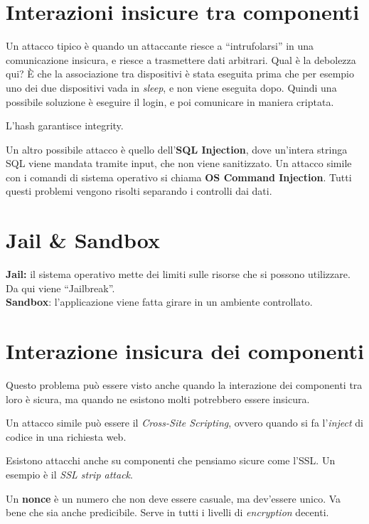 \section{Interazioni insicure tra componenti}

Un attacco tipico è quando un attaccante riesce a ``intrufolarsi'' in una 
comunicazione insicura, e riesce a trasmettere dati arbitrari.
Qual è la debolezza qui? È che la associazione tra dispositivi è stata eseguita 
prima che per esempio uno dei due dispositivi vada in \textit{sleep}, e non 
viene eseguita dopo. Quindi una possibile soluzione è eseguire il login, e poi 
comunicare in maniera criptata.

L'hash garantisce integrity.

Un altro possibile attacco è quello dell'\textbf{SQL Injection}, dove un'intera 
stringa SQL viene mandata tramite input, che non viene sanitizzato. Un attacco 
simile con i comandi di sistema operativo si chiama \textbf{OS Command 
Injection}. Tutti questi problemi vengono risolti separando i controlli dai 
dati.

\section{Jail \& Sandbox}

\textbf{Jail:} il sistema operativo mette dei limiti sulle risorse che si
possono utilizzare.
Da qui viene ``Jailbreak''.\\
\newline
\textbf{Sandbox}: l'applicazione viene fatta girare in un ambiente controllato.


\section{Interazione insicura dei componenti}

Questo problema può essere visto anche quando la interazione dei componenti tra 
loro è sicura, ma quando ne esistono molti potrebbero essere insicura.

Un attacco simile può essere il \textit{Cross-Site Scripting}, ovvero quando si 
fa l'\textit{inject} di codice in una richiesta web.


Esistono attacchi anche su componenti che pensiamo sicure come l'SSL. Un
esempio è il \textit{SSL strip attack}.

Un \textbf{nonce} è un numero che non deve essere casuale, ma dev'essere unico. 
Va bene che sia anche predicibile. Serve in tutti i livelli di 
\textit{encryption} decenti.
